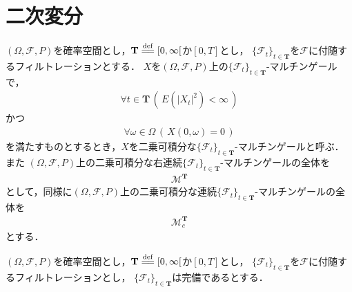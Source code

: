 \section{二次変分}
	\begin{screen}
		\begin{dfn}[二乗可積分マルチンゲール]
			$(\Omega,\mathscr{F},P)$を確率空間とし，$\mathbf{T} \defeq [0,\infty[$か$[0,T]$とし，
			$\{\mathscr{F}_t\}_{t \in \mathbf{T}}$を$\mathscr{F}$に付随するフィルトレーションとする．
			$X$を$(\Omega,\mathscr{F},P)$上の$\{\mathscr{F}_t\}_{t \in \mathbf{T}}$-マルチンゲールで，
			\begin{align}
				\forall t \in \mathbf{T}\, \left(\, E\left(|X_t|^2\right) < \infty\, \right)
			\end{align}
			かつ
			\begin{align}
				\forall \omega \in \Omega\, \left(\, X(0,\omega) = 0\, \right)
			\end{align}
			を満たすものとするとき，$X$を二乗可積分な$\{\mathscr{F}_t\}_{t \in \mathbf{T}}$-マルチンゲールと呼ぶ．また
			$(\Omega,\mathscr{F},P)$上の二乗可積分な右連続$\{\mathscr{F}_t\}_{t \in \mathbf{T}}$-マルチンゲールの全体を
			\begin{align}
				\mathscr{M}^{\mathbf{T}}
			\end{align}
			として，同様に$(\Omega,\mathscr{F},P)$上の二乗可積分な連続$\{\mathscr{F}_t\}_{t \in \mathbf{T}}$-マルチンゲールの全体を
			\begin{align}
				\mathscr{M}^{\mathbf{T}}_c
			\end{align}
			とする．
		\end{dfn}
	\end{screen}
	
	\begin{screen}
		\begin{thm}[Doobの劣マルチンゲール不等式]
		\end{thm}
	\end{screen}
	
	\begin{screen}
		\begin{thm}
			$(\Omega,\mathscr{F},P)$を確率空間とし，$\mathbf{T} \defeq [0,\infty[$か$[0,T]$とし，
			$\{\mathscr{F}_t\}_{t \in \mathbf{T}}$を$\mathscr{F}$に付随するフィルトレーションとし，
			$\{\mathscr{F}_t\}_{t \in \mathbf{T}}$は完備であるとする．
		\end{thm}
	\end{screen}
	
